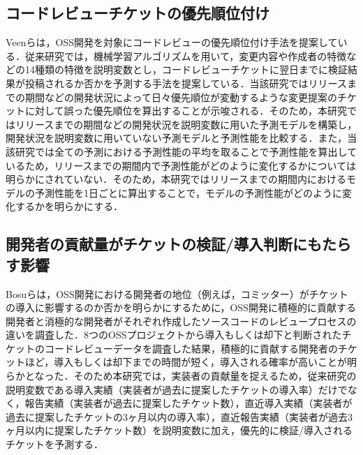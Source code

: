 \documentclass[11pt]{jreport}
\begin{document}
\subsection{コードレビューチケットの優先順位付け}
Veen\cite{prioritizer}らは，OSS開発を対象にコードレビューの優先順位付け手法を提案している．従来研究では，機械学習アルゴリズムを用いて，変更内容や作成者の特徴などの14種類の特徴を説明変数とし，コードレビューチケットに翌日までに検証結果が投稿されるか否かを予測する手法を提案している．当該研究ではリリースまでの期間などの開発状況によって日々優先順位が変動するような変更提案のチケットに対して誤った優先順位を算出することが示唆される．そのため，本研究ではリリースまでの期間などの開発状況を説明変数に用いた予測モデルを構築し，開発状況を説明変数に用いていない予測モデルと予測性能を比較する．また，当該研究では全ての予測における予測性能の平均を取ることで予測性能を算出しているため，リリースまでの期間内で予測性能がどのように変化するかについては明らかにされていない．そのため，本研究ではリリースまでの期間内におけるモデルの予測性能を1日ごとに算出することで，モデルの予測性能がどのように変化するかを明らかにする．

\subsection{開発者の貢献量がチケットの検証/導入判断にもたらす影響}
Bosu\cite{review1}らは，OSS開発における開発者の地位（例えば，コミッター）がチケットの導入に影響するのか否かを明らかにするために，OSS開発に積極的に貢献する開発者と消極的な開発者がそれぞれ作成したソースコードのレビュープロセスの違いを調査した．8つのOSSプロジェクトから導入もしくは却下と判断されたチケットのコードレビューデータを調査した結果，積極的に貢献する開発者のチケットほど，導入もしくは却下までの時間が短く，導入される確率が高いことが明らかとなった．そのため本研究では，実装者の貢献量を捉えるため，従来研究\cite{prioritizer}の説明変数である導入実績（実装者が過去に提案したチケットの導入率）だけでなく，報告実績（実装者が過去に提案したチケット数），直近導入実績（実装者が過去に提案したチケットの3ヶ月以内の導入率），直近報告実績（実装者が過去3ヶ月以内に提案したチケット数）を説明変数に加え，優先的に検証/導入されるチケットを予測する．
\end{document}
